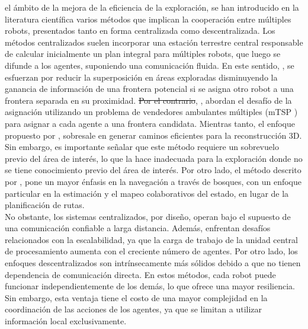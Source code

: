 \documentclass[sigconf]{acmart}
\providecommand{\DIFadd}[1]{{\protect\color{blue}\uwave{#1}}} %
\providecommand{\DIFdel}[1]{{\protect\color{red}\sout{#1}}}                      %
\providecommand{\DIFaddbegin}{} %
\providecommand{\DIFaddend}{} %
\providecommand{\DIFdelbegin}{} %
\providecommand{\DIFdelend}{} %
\begin{document}
\DIFadd{En }\DIFaddend el ámbito de la mejora de la eficiencia de la exploración, se han introducido en la literatura científica varios métodos que implican la cooperación entre múltiples robots, presentados tanto en forma centralizada como descentralizada. Los métodos centralizados suelen incorporar una estación terrestre central responsable de calcular inicialmente un plan integral para múltiples robots, que luego se difunde a los agentes, suponiendo una comunicación fluida. En este sentido, \citeauthor{1435481} \cite{1435481}, se esfuerzan por reducir la superposición en áreas exploradas disminuyendo la ganancia de información de una frontera potencial si se asigna otro robot a una frontera separada en su proximidad. \DIFdelbegin \DIFdel{Por el contrario}\DIFdelend \DIFaddbegin \DIFadd{En cambio}\DIFaddend , \citeauthor{Tian} \cite{Tian}, abordan el desafío de la asignación utilizando un problema de vendedores ambulantes múltiples (mTSP \DIFaddbegin \DIFadd{por sus siglas en inglés}\DIFaddend ) para asignar a cada agente a una frontera candidata. Mientras tanto, el enfoque propuesto por \citeauthor{9844235} \cite{9844235}, sobresale en generar caminos eficientes para la reconstrucción 3D. Sin embargo, es importante señalar que este método requiere un sobrevuelo previo del área de interés, lo que la hace inadecuada para la exploración donde no se tiene conocimiento previo del área de interés. Por otro lado, el método descrito por \citeauthor{Tian} \cite{Tian}, pone un mayor énfasis en la navegación a través de bosques, con un enfoque particular en la estimación y el mapeo colaborativos del estado, en lugar de la planificación de rutas.\\

No obstante, los sistemas centralizados, por diseño, operan bajo el supuesto de una comunicación confiable a larga distancia. Además, enfrentan desafíos relacionados con la escalabilidad, ya que la carga de trabajo de la unidad central de procesamiento aumenta con el creciente número de agentes. Por otro lado, los enfoques descentralizados son intrínsecamente más sólidos debido a que no tienen dependencia de comunicación directa. En estos métodos, cada robot puede funcionar independientemente de los demás, lo que ofrece una mayor resiliencia. Sin embargo, esta ventaja tiene el costo de una mayor complejidad en la coordinación de las acciones de los agentes, ya que se limitan a utilizar información local exclusivamente.\\
\end{document}
